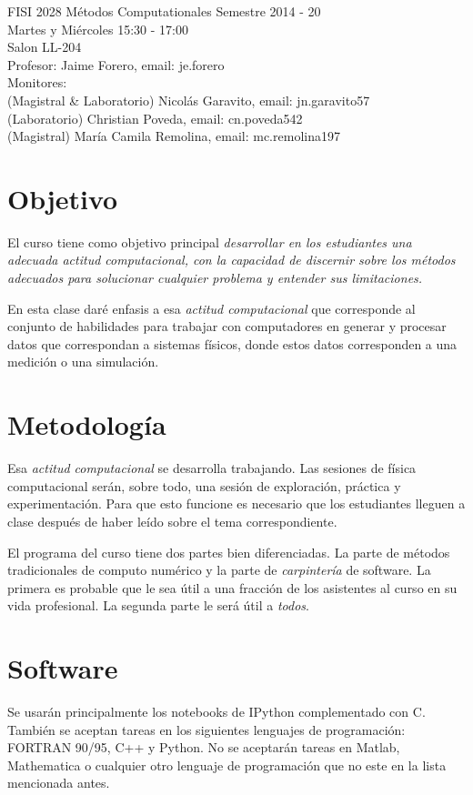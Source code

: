 \documentclass[11pt]{article}
\begin{document}
\noindent
FISI 2028 M\'etodos Computationales
Semestre 2014 - 20\\
Martes y Mi\'ercoles 15:30 - 17:00 \\
Salon LL-204\\
Profesor: Jaime Forero, email: je.forero\\
Monitores: \\
(Magistral \& Laboratorio) Nicol\'as Garavito, email: jn.garavito57\\
(Laboratorio) Christian Poveda, email: cn.poveda542\\
(Magistral) Mar\'ia Camila Remolina, email: mc.remolina197\\


\section*{Objetivo}
El curso tiene como objetivo principal \emph{desarrollar en los
  estudiantes una adecuada actitud computacional, con la capacidad de
  discernir sobre los m\'etodos adecuados para solucionar cualquier
  problema y entender sus limitaciones.} 
 
En esta clase dar\'e enfasis a esa \emph{actitud computacional} que
corresponde al conjunto de habilidades para trabajar con computadores
en generar y procesar datos que correspondan a sistemas f\'isicos,
donde estos datos corresponden a una medici\'on o una simulaci\'on. 

\section*{Metodolog\'ia}
Esa \emph{actitud computacional} se desarrolla trabajando. Las
sesiones de f\'isica computacional ser\'an, sobre todo, una sesi\'on
de exploraci\'on, pr\'actica y experimentaci\'on. Para que esto
funcione es necesario que los estudiantes lleguen a clase despu\'es de
haber le\'ido sobre el tema correspondiente. 

El programa del curso tiene dos partes bien diferenciadas. La parte de
m\'etodos tradicionales de computo num\'erico y la parte de
\emph{carpinter\'ia} de software. La primera es probable que le sea
\'util a una fracci\'on de los asistentes al curso en su vida
profesional. La segunda parte le ser\'a \'util a \emph{todos}. 


\section*{Software}
\noindent Se usar\'an principalmente los notebooks de IPython
complementado con C. Tambi\'en se aceptan tareas en los siguientes
lenguajes de programaci\'on: FORTRAN 90/95, C++ y Python. No se
aceptar\'an tareas en Matlab, Mathematica o cualquier otro lenguaje
de programaci\'on que no este en la lista mencionada antes.  
\end{document}
